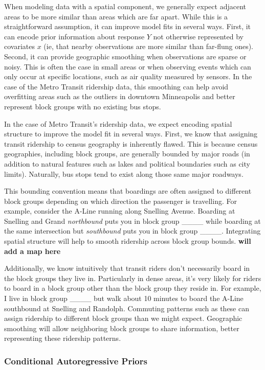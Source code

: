 \documentclass[]{article}
\begin{document}
When modeling data with a spatial component, we generally expect
adjacent areas to be more similar than areas which are far apart. While
this is a straightforward assumption, it can improve model fits in
several ways. First, it can encode prior information about response
\(Y\) not otherwise represented by covariates \(x\) (ie, that nearby
observations are more similar than far-flung ones). Second, it can
provide geographic smoothing when observations are sparse or noisy. This
is often the case in small areas or when observing events which can only
occur at specific locations, such as air quality measured by sensors. In
the case of the Metro Transit ridership data, this smoothing can help
avoid overfitting areas such as the outliers in downtown Minneapolis and
better represent block groups with no existing bus stops.

In the case of Metro Transit's ridership data, we expect encoding
spatial structure to improve the model fit in several ways. First, we
know that assigning transit ridership to census geography is inherently
flawed. This is because census geographies, including block groups, are
generally bounded by major roads (in addition to natural features such
as lakes and political boundaries such as city limits). Naturally, bus
stops tend to exist along those same major roadways.

This bounding convention means that boardings are often assigned to
different block groups depending on which direction the passenger is
travelling. For example, consider the A-Line running along Snelling
Avenue. Boarding at Snelling and Grand \emph{northbound} puts you in
block group \_\_\_\_ while boarding at the same intersection but
\emph{southbound} puts you in block group \_\_\_\_. Integrating spatial
structure will help to smooth ridership across block group bounds.
\textbf{will add a map here}

Additionally, we know intuitively that transit riders don't necessarily
board in the block groups they live in. Particularly in dense areas,
it's very likely for riders to board in a block group other than the
block group they reside in. For example, I live in block group \_\_\_\_
but walk about 10 minutes to board the A-Line southbound at Snelling and
Randolph. Commuting patterns such as these can assign ridership to
different block groups than we might expect. Geographic smoothing will
allow neighboring block groups to share information, better representing
these ridership patterns.

\subsubsection{Conditional Autoregressive
Priors}\label{conditional-autoregressive-priors}
\end{document}
